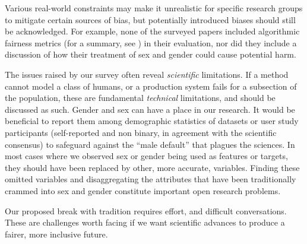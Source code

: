 \documentclass[nonacm,sigconf,review,balance=false]{acmart}
\begin{document}
Various real-world constraints may make it unrealistic for specific research groups to mitigate certain sources of bias, but potentially introduced biases should still be acknowledged. For example, none of the surveyed papers included algorithmic fairness metrics (for a summary, see \cite{fairnesssurvey, fairnessmetrics}) in their evaluation, nor did they include a discussion of how their treatment of sex and gender could cause potential harm.

The issues raised by our survey often reveal \emph{scientific} limitations. If a method cannot model a class of humans, or a production system fails for a subsection of the population, these are fundamental \emph{technical} limitations, and should be discussed as such. Gender and sex can have a place in our research. It would be beneficial to report them among demographic statistics of datasets or user study participants (self-reported and non binary, in agreement with the scientific consensus) to
safeguard against the “male default” that plagues the sciences. In most cases where we observed sex or gender being used as features or targets, they should have been replaced by other, more accurate, variables. Finding these omitted variables and disaggregating the attributes that have been traditionally crammed into sex and gender constitute important open research problems.

Our proposed break with tradition requires effort, and difficult conversations. These are challenges worth facing if we want scientific advances to produce a fairer, more inclusive future.
\end{document}
